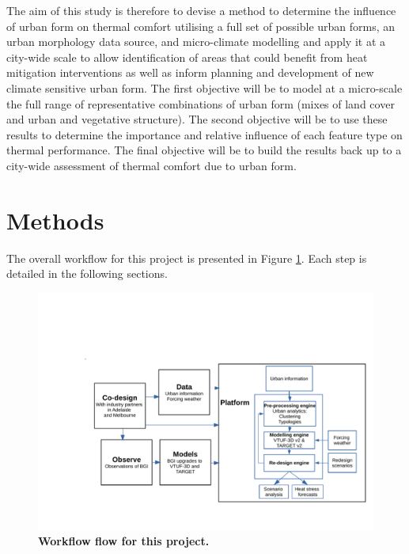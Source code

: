 \documentclass[final,3p,times,authoryear]{elsarticle}
\begin{document}
The aim of this study is therefore to devise a method to determine the influence of urban form on thermal comfort utilising a full set of possible urban forms, an urban morphology data source, and micro-climate modelling and apply it at a city-wide scale to allow identification of areas that could benefit from heat mitigation interventions as well as inform planning and development of new climate sensitive urban form. The first objective will be to model at a micro-scale the full range of representative combinations of urban form (mixes of land cover and urban and vegetative structure). The second objective will be to use these results to determine the importance and relative influence of each feature type on thermal performance. The final objective will be to build the results back up to a city-wide assessment of thermal comfort due to urban form.

\section{Methods}\label{sec:methods}

The overall workflow for this project is presented in Figure \ref{fig:process}. Each step is detailed in the following sections.


\begin{figure}[ht]
\centering
\includegraphics[page=2,trim={46 280 100 10},clip,scale=0.45]{Figures/Processes.pdf}
\caption{\bf Workflow flow for this project.}
 \label{fig:process}
\end{figure} 

\end{document}
